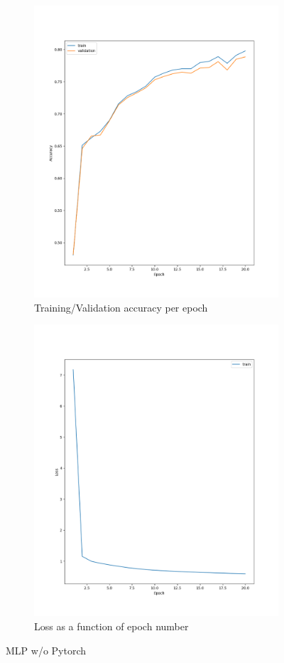 \documentclass[11pt]{article}
\begin{document}
\begin{figure}[h!]
\centering
\begin{subfigure}{.5\textwidth}
  \centering
  \includegraphics[width=.9\linewidth]{./plots/mlp_acc_per_epoch.png}
  \caption{Training/Validation accuracy per epoch}
\end{subfigure}%
\begin{subfigure}{.5\textwidth}
  \centering
  \includegraphics[width=.9\linewidth]{./plots/mlp_loss_per_epoch.png}
  \caption{Loss as a function of epoch number}
\end{subfigure}
\caption{MLP w/o Pytorch}
\label{fig:mlp2b}
\end{figure}
\pagebreak
\end{document}
